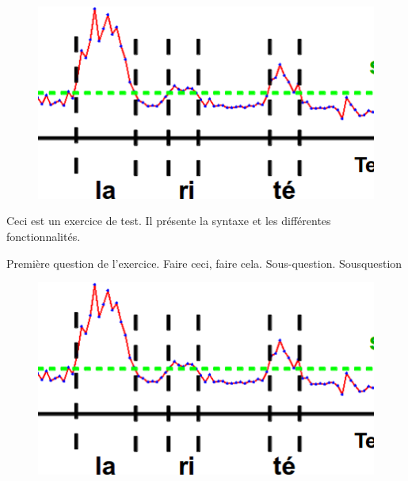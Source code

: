 

\begin{figure}
    \centering
    \includegraphics[width=\linewidth]{images/1.png}
\end{figure}

Ceci est un exercice de test. Il présente la syntaxe et les différentes fonctionnalités.

\question Première question de l'exercice. Faire ceci, faire cela.
\subquestion Sous-question.
\question \subquestion Sousquestion


\begin{figure}
    \centering
    \includegraphics[width=\linewidth]{images/1.png}
\end{figure}

